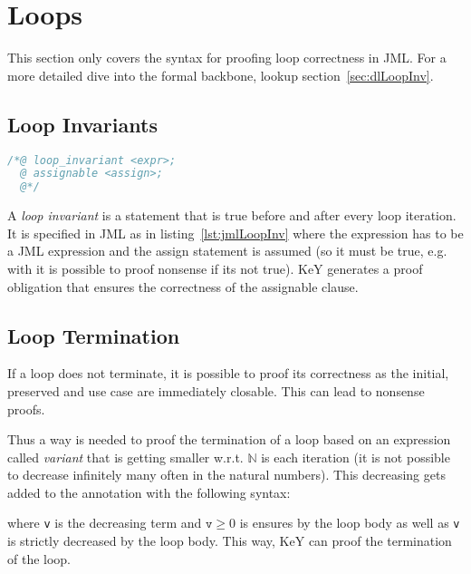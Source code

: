	\section{Loops}
		This section only covers the syntax for proofing loop correctness in JML. For a more detailed dive into the formal backbone, lookup section~\ref{sec:dlLoopInv}.
	
		\subsection{Loop Invariants}
			\label{sec:loopinv}
		
			\begin{lstlisting}[caption = { Loop Invariants in JML }, label = lst:jmlLoopInv, language = Java]
/*@ loop_invariant <expr>;
  @ assignable <assign>;
  @*/
			\end{lstlisting}
		
			A \textit{loop invariant} is a statement that is true before and after every loop iteration. It is specified in JML as in listing~\ref{lst:jmlLoopInv} where the expression has to be a  JML expression and the assign statement is assumed (so it must be true, e.g. with  it is possible to proof nonsense if its not true). KeY generates a proof obligation that ensures the correctness of the assignable clause.

		\subsection{Loop Termination}
			If a loop does not terminate, it is possible to proof its correctness as the initial, preserved and use case are immediately closable. This can lead to nonsense proofs.
			
			Thus a way is needed to proof the termination of a loop based on an expression called \textit{variant} that is getting smaller w.r.t. \( \mathbb{N} \) is each iteration (it is not possible to decrease infinitely many often in the natural numbers). This decreasing gets added to the  annotation with the following syntax:
			\begin{center}
			\end{center}
			where \texttt{v} is the decreasing term and \( \texttt{v} \geq 0 \) is ensures by the loop body as well as \texttt{v} is strictly decreased by the loop body. This way, KeY can proof the termination of the loop.

